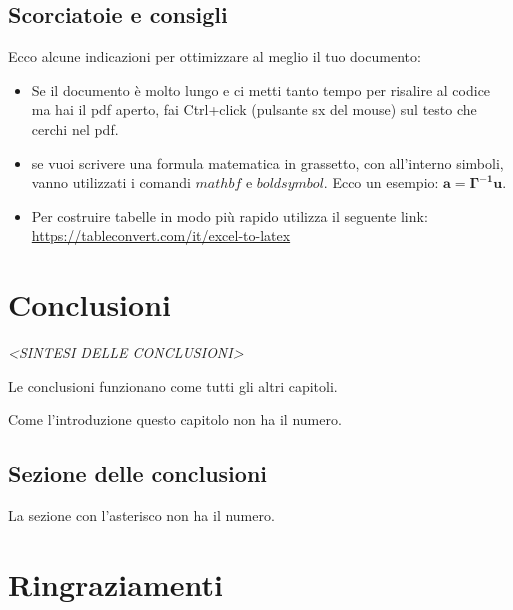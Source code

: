 \documentclass[envcountsame,envcountchap]{styles/svmono}
\begin{document}
\section{Scorciatoie e consigli}

Ecco alcune indicazioni per ottimizzare al meglio il tuo documento:

\begin{itemize}
    \item Se il documento è molto lungo e ci metti tanto tempo
    per risalire al codice ma hai il pdf aperto, 
    fai Ctrl+click (pulsante sx del mouse) sul testo che cerchi nel pdf.
    \item se vuoi scrivere una formula matematica in grassetto, con all'interno simboli, vanno utilizzati
    i comandi $mathbf$ e $boldsymbol$. Ecco un esempio: $\mathbf{a=\boldsymbol{\Gamma}^{-1}u}$.
    \item Per costruire tabelle in modo più rapido utilizza il seguente link: \url{https://tableconvert.com/it/excel-to-latex}
\end{itemize}

    


\chapter*{Conclusioni}

\vspace{2cm}

\begin{flushright}
 \textit{<SINTESI DELLE CONCLUSIONI>}
\end{flushright}

\vspace{0.5cm}

Le conclusioni funzionano come tutti gli altri capitoli.

Come l'introduzione questo capitolo non ha il numero.

\section*{Sezione delle conclusioni}
La sezione con l'asterisco non ha il numero.

\chapter*{Ringraziamenti}







\end{document}

